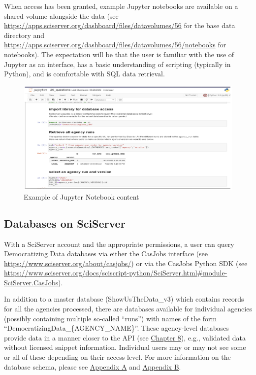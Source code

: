 \documentclass[titlepage, 11pt]{article}
\begin{document}
{When access has been granted, example Jupyter notebooks are available on a shared volume alongside the data (see \url{https://apps.sciserver.org/dashboard/files/datavolumes/56} for the base data directory and \url{https://apps.sciserver.org/dashboard/files/datavolumes/56/notebooks} for notebooks). The expectation will be that the user is familiar with the use of Jupyter as an interface, has a basic understanding of scripting (typically in Python), and is comfortable with SQL data retrieval.

\begin{figure}
  \includegraphics[scale=0.47]{Jupyter_notebook.png}
  \caption{Example of Jupyter Notebook content}
  \label{fig:jupyter_notebook}
\end{figure}


\subsection{Databases on SciServer}

With a SciServer account and the appropriate permissions, a user can query Democratizing Data databases via either the CasJobs interface (see \url{https://www.sciserver.org/about/casjobs/}) or via the CasJobs Python SDK (see \url{https://www.sciserver.org/docs/sciscript-python/SciServer.html#module-SciServer.CasJobs}). 

In addition to a master database (ShowUsTheData\_v3) which contains records for all the agencies processed, there are databases available for individual agencies (possibly containing multiple so-called “runs”) with names of the form “DemocratizingData\_\{AGENCY\_NAME\}”. These agency-level databases provide data in a manner closer to the API (see \hyperref[sec:Chapter8]{Chapter 8}), e.g., validated data without licensed snippet information. Individual users may or may not see some or all of these depending on their access level. For more information on the database schema, please see \hyperref[sec:APPENDIXA]{Appendix A} and \hyperref[sec:APPENDIXB]{Appendix B}.

}
\end{document}
